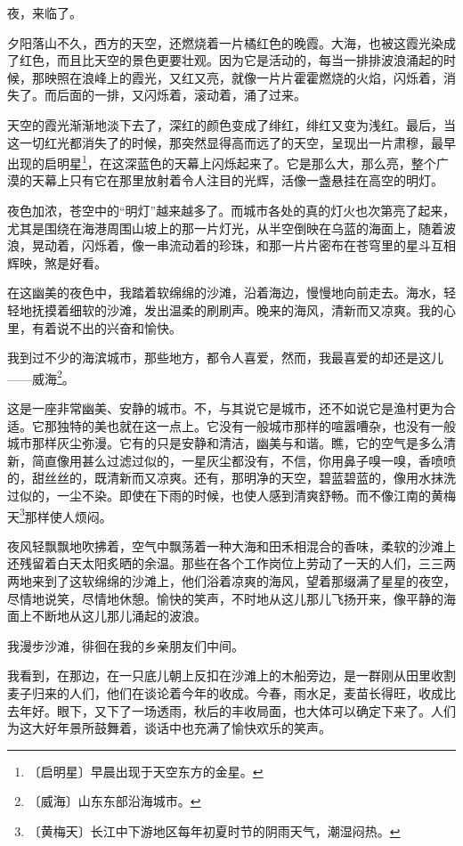 \documentclass[12pt,UTF-8,openany]{ctexbook}
\begin{document}
\begin{large}
    
    夜，来临了。
    
    夕阳落山不久，西方的天空，还燃烧着一片橘红色的晚霞。大海，也被这霞光染成了红色，而且比天空的景色更要壮观。因为它是活动的，每当一排排波浪涌起的时候，那映照在浪峰上的霞光，又红又亮，就像一片片霍霍燃烧的火焰，闪烁着，消失了。而后面的一排，又闪烁着，滚动着，涌了过来。
    
    天空的霞光渐渐地淡下去了，深红的颜色变成了绯红，绯红又变为浅红。最后，当这一切红光都消失了的时候，那突然显得高而远了的天空，呈现出一片肃穆，最早出现的启明星\footnote{〔启明星〕早晨出现于天空东方的金星。}，在这深蓝色的天幕上闪烁起来了。它是那么大，那么亮，整个广漠的天幕上只有它在那里放射着令人注目的光辉，活像一盏悬挂在高空的明灯。
    
    夜色加浓，苍空中的“明灯”越来越多了。而城市各处的真的灯火也次第亮了起来，尤其是围绕在海港周围山坡上的那一片灯光，从半空倒映在乌蓝的海面上，随着波浪，晃动着，闪烁着，像一串流动着的珍珠，和那一片片密布在苍穹里的星斗互相辉映，煞是好看。
    
    在这幽美的夜色中，我踏着软绵绵的沙滩，沿着海边，慢慢地向前走去。海水，轻轻地抚摸着细软的沙滩，发出温柔的刷刷声。晚来的海风，清新而又凉爽。我的心里，有着说不出的兴奋和愉快。
    
    我到过不少的海滨城市，那些地方，都令人喜爱，然而，我最喜爱的却还是这儿——威海\footnote{〔威海〕山东东部沿海城市。}。
    
    这是一座非常幽美、安静的城市。不，与其说它是城市，还不如说它是渔村更为合适。它那独特的美也就在这一点上。它没有一般城市那样的喧嚣嘈杂，也没有一般城市那样灰尘弥漫。它有的只是安静和清洁，幽美与和谐。瞧，它的空气是多么清新，简直像用甚么过滤过似的，一星灰尘都没有，不信，你用鼻子嗅一嗅，香喷喷的，甜丝丝的，既清新而又凉爽。还有，那明净的天空，碧蓝碧蓝的，像用水抹洗过似的，一尘不染。即使在下雨的时候，也使人感到清爽舒畅。而不像江南的黄梅天\footnote{〔黄梅天〕长江中下游地区每年初夏时节的阴雨天气，潮湿闷热。}那样使人烦闷。
    
    夜风轻飘飘地吹拂着，空气中飘荡着一种大海和田禾相混合的香味，柔软的沙滩上还残留着白天太阳炙晒的余温。那些在各个工作岗位上劳动了一天的人们，三三两两地来到了这软绵绵的沙滩上，他们浴着凉爽的海风，望着那缀满了星星的夜空，尽情地说笑，尽情地休憩。愉快的笑声，不时地从这儿那儿飞扬开来，像平静的海面上不断地从这儿那儿涌起的波浪。
    
    我漫步沙滩，徘徊在我的乡亲朋友们中间。
    
    我看到，在那边，在一只底儿朝上反扣在沙滩上的木船旁边，是一群刚从田里收割麦子归来的人们，他们在谈论着今年的收成。今春，雨水足，麦苗长得旺，收成比去年好。眼下，又下了一场透雨，秋后的丰收局面，也大体可以确定下来了。人们为这大好年景所鼓舞着，谈话中也充满了愉快欢乐的笑声。
    

\end{large}
\end{document}
